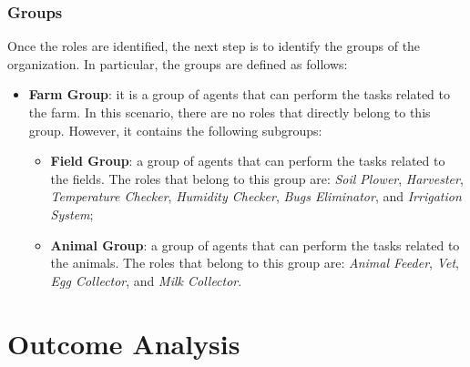 \subsubsection{Groups}
Once the roles are identified, the next step is to identify the groups of the organization.
In particular, the groups are defined as follows:
\begin{itemize}
    \item \textbf{Farm Group}: it is a group of agents that can perform the tasks related to the farm.
    In this scenario, there are no roles that directly belong to this group.
    However, it contains the following subgroups:
    \begin{itemize}
        \item \textbf{Field Group}: a group of agents that can perform the tasks related to the fields.
        The roles that belong to this group are: \textit{Soil Plower}, \textit{Harvester}, \textit{Temperature Checker}, \textit{Humidity Checker}, \textit{Bugs Eliminator}, and \textit{Irrigation System};
        \item \textbf{Animal Group}: a group of agents that can perform the tasks related to the animals.
        The roles that belong to this group are: \textit{Animal Feeder}, \textit{Vet}, \textit{Egg Collector}, and \textit{Milk Collector}.
    \end{itemize}
\end{itemize}

\section{Outcome Analysis}